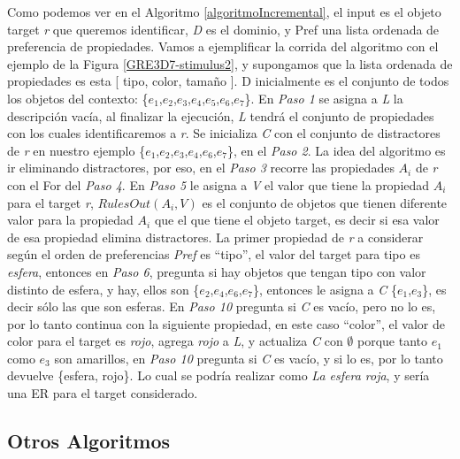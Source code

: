 Como podemos ver en el Algoritmo \ref{algoritmoIncremental}, el input es el objeto target \emph{r} que queremos identificar, \emph{D} es el dominio, y Pref una lista ordenada de preferencia de propiedades. Vamos a ejemplificar la corrida del algoritmo con el ejemplo de la Figura \ref{GRE3D7-stimulus2}, y supongamos que la lista ordenada de propiedades es esta [ tipo, color, tama\~no ]. D inicialmente es el conjunto de todos los objetos del contexto: \{$e_{1}$,$e_{2}$,$e_{3}$,$e_{4}$,$e_{5}$,$e_{6}$,$e_{7}$\}.
En {\it Paso 1} se asigna a \emph{L} la descripci\'on vac\'{i}a, al finalizar la ejecuci\'on, \emph{L} tendr\'a el conjunto de propiedades con los cuales identificaremos a \emph{r}. Se inicializa \emph{C} con el conjunto de distractores de \emph{r} en nuestro ejemplo \{$e_{1}$,$e_{2}$,$e_{3}$,$e_{4}$,$e_{6}$,$e_{7}$\}, en el {\it Paso 2}. 
La idea del algoritmo es ir eliminando distractores, por eso, en el {\it Paso 3} recorre las propiedades $A_{i}$ de \emph{r} con el For del {\it Paso 4}. En {\it Paso 5} le asigna a \emph{V} el valor que tiene la propiedad $A_{i}$ para el target \emph{r}, $RulesOut(A_{i},V)$ es el conjunto de objetos que tienen diferente valor para la propiedad $A_{i}$ que el que tiene el objeto target, es decir si esa valor de esa propiedad elimina distractores. La primer propiedad de \emph{r} a considerar seg\'un el orden de preferencias \emph{Pref} es ``tipo'', el valor del target para tipo es {\it esfera}, entonces en {\it Paso 6}, pregunta si hay objetos que tengan tipo con valor distinto de esfera, y hay, ellos son \{$e_{2}$,$e_{4}$,$e_{6}$,$e_{7}$\}, entonces le asigna a \emph{C} \{$e_{1}$,$e_{3}$\}, es decir s\'olo las que son esferas. En {\it Paso 10} pregunta si \emph{C} es vac\'io, pero no lo es, por lo tanto continua con la siguiente propiedad, en este caso ``color'', el valor de color para el target es {\it rojo}, agrega {\it rojo} a \emph{L}, y actualiza \emph{C} con $\emptyset$ porque tanto $e_{1}$ como $e_{3}$ son amarillos, en {\it Paso 10} pregunta si \emph{C} es vac\'io, y si lo es, por lo tanto devuelve \{esfera, rojo\}. Lo cual se podr\'ia realizar como {\it La esfera roja}, y ser\'ia una ER para el target considerado.


\subsection{Otros Algoritmos}

